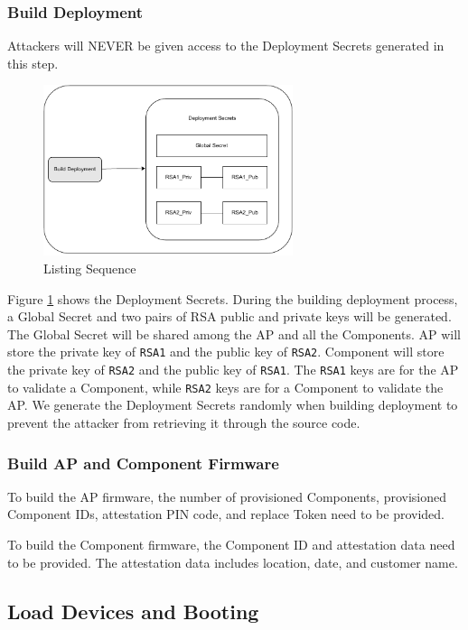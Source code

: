 \documentclass[11pt,oneside,onecolumn,letterpaper]{article}
\begin{document}
\subsubsection{Build Deployment}
Attackers will NEVER be given access to the Deployment Secrets generated in this step.
\begin{figure}[h]
	\centering
	\includegraphics[width=0.65\textwidth]{pics/secret.pdf}
	\caption{Listing Sequence}
	\label{fig:secret}
\end{figure}

Figure \ref{fig:secret} shows the Deployment Secrets.
During the building deployment process,
a Global Secret and two pairs of RSA public and private keys will be generated.
The Global Secret will be shared among the AP and all the Components.
AP will store the private key of \texttt{RSA1} and the public key of \texttt{RSA2}.
Component will store the private key of \texttt{RSA2} and the public key of \texttt{RSA1}.
The \texttt{RSA1} keys are for the AP to validate a Component,
while \texttt{RSA2} keys are for a Component to validate the AP.
We generate the Deployment Secrets randomly when building deployment to prevent the attacker from retrieving it through the source code.

\subsubsection{Build AP and Component Firmware}
To build the AP firmware,
the number of provisioned Components,
provisioned Component IDs,
attestation PIN code,
and replace Token need to be provided.

To build the Component firmware,
the Component ID and attestation data need to be provided.
The attestation data includes location,
date,
and customer name.

\subsection{Load Devices and Booting}
\end{document}

